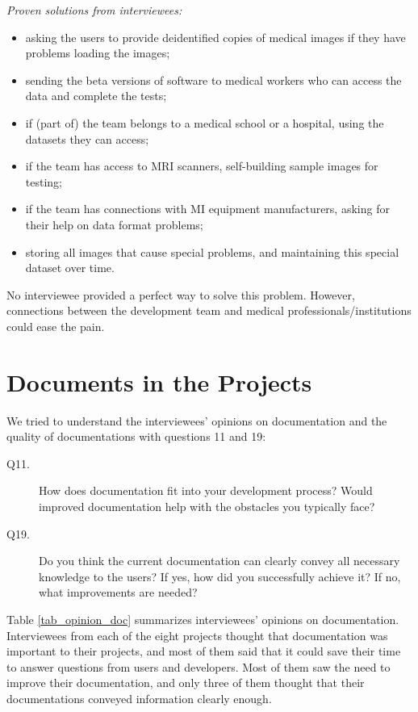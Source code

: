 \noindent\textit{Proven solutions from interviewees:}
\begin{itemize}
\item asking the users to provide deidentified copies of medical images if they have problems loading the images;
\item sending the beta versions of software to medical workers who can access the data and complete the tests;
\item if (part of) the team belongs to a medical school or a hospital, using the datasets they can access;
\item if the team has access to MRI scanners, self-building sample images for testing;
\item if the team has connections with MI equipment manufacturers, asking for their help on data format problems;
\item storing all images that cause special problems, and maintaining this special dataset over time.
\end{itemize}

No interviewee provided a perfect way to solve this problem. However, connections between the development team and medical professionals/institutions could ease the pain.

\section{Documents in the Projects}
\label{sec_interview_documents}
We tried to understand the interviewees' opinions on documentation and the quality of documentations with questions 11 and 19:

\begin{description}
\item[Q11.] How does documentation fit into your development process? Would improved documentation help with the obstacles you typically face?
\item[Q19.] Do you think the current documentation can clearly convey all necessary knowledge to the users? If yes, how did you successfully achieve it? If no, what improvements are needed?
\end{description}

Table \ref{tab_opinion_doc} summarizes interviewees' opinions on documentation. Interviewees from each of the eight projects thought that documentation was important to their projects, and most of them said that it could save their time to answer questions from users and developers. Most of them saw the need to improve their documentation, and only three of them thought that their documentations conveyed information clearly enough. 

